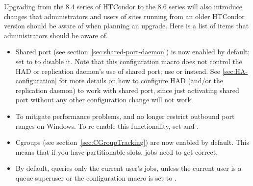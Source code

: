 Upgrading from the 8.4 series of HTCondor to the 8.6 series will
also introduce changes that administrators and users of sites running from an older
HTCondor version should be aware of when planning an upgrade.
Here is a list of items that administrators should be aware of.

\begin{itemize}

\item Shared port (see section~\ref{sec:shared-port-daemon}) is now
enabled by default; set  to  to
disable it.  Note that this configuration macro does not control the HAD or
replication daemon's use of shared port; use 
or  instead.  See
\ref{sec:HA-configuration} for more details on how to configure HAD (and/or
the replication daemon) to work with shared port, since just activating
shared port without any other configuration change will not work.

\item To mitigate performance problems,  and
 no longer restrict outbound port ranges on Windows.  To
re-enable this functionality, set  and
.  

\item Cgroups (see section~\ref{sec:CGroupTracking}) are now enabled by default.  This means that if you
have partitionable slots, jobs need to get 
correct.

\item By default,  queries only the current user's jobs,
unless the current user is a queue superuser or the
 configuration macro is set to
.


\end{itemize}

